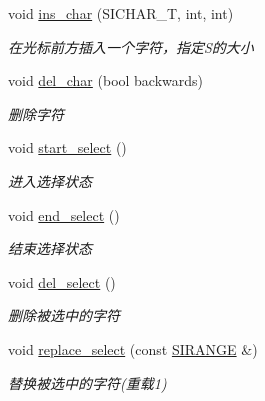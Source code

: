 \begin{DoxyCompactItemize}
\mbox{\label{class_s_i_t_e_x_t_aad511d1ac1db11e0f7e462e927562c4d}} 
void \hyperlink{class_s_i_t_e_x_t_aad511d1ac1db11e0f7e462e927562c4d}{ins\+\_\+char} (S\+I\+C\+H\+A\+R\+\_\+T, int, int)
\begin{DoxyCompactList}\small\item\em 在光标前方插入一个字符，指定\+S的大小 \end{DoxyCompactList}\item 
void \hyperlink{class_s_i_t_e_x_t_ac7262ab8b1305edc15cc6e4fb783f7d6}{del\+\_\+char} (bool backwards)
\begin{DoxyCompactList}\small\item\em 删除字符~\newline
\end{DoxyCompactList}\item 
\mbox{\label{class_s_i_t_e_x_t_a64816d0a3be43c67522eb09cd6b4eb94}} 
void \hyperlink{class_s_i_t_e_x_t_a64816d0a3be43c67522eb09cd6b4eb94}{start\+\_\+select} ()
\begin{DoxyCompactList}\small\item\em 进入选择状态 \end{DoxyCompactList}\item 
\mbox{\label{class_s_i_t_e_x_t_ab33035ffd92c0d5859c61c37f26de48c}} 
void \hyperlink{class_s_i_t_e_x_t_ab33035ffd92c0d5859c61c37f26de48c}{end\+\_\+select} ()
\begin{DoxyCompactList}\small\item\em 结束选择状态 \end{DoxyCompactList}\item 
\mbox{\label{class_s_i_t_e_x_t_a4b703f105335a08b6080cb8b233ea6c0}} 
void \hyperlink{class_s_i_t_e_x_t_a4b703f105335a08b6080cb8b233ea6c0}{del\+\_\+select} ()
\begin{DoxyCompactList}\small\item\em 删除被选中的字符 \end{DoxyCompactList}\item 
\mbox{\label{class_s_i_t_e_x_t_a5919f6a8ad7413503660035259a84fbe}} 
void \hyperlink{class_s_i_t_e_x_t_a5919f6a8ad7413503660035259a84fbe}{replace\+\_\+select} (const \hyperlink{struct_s_i_r_a_n_g_e}{S\+I\+R\+A\+N\+GE} \&)
\begin{DoxyCompactList}\small\item\em 替换被选中的字符(重载1) \end{DoxyCompactList}\item 

\end{DoxyCompactItemize}
